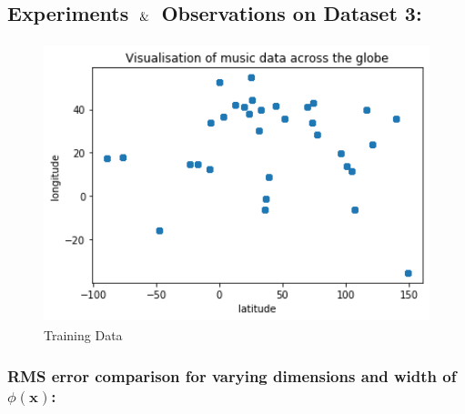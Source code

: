 





\subsection{Experiments $\And$ Observations on Dataset 3:}

\begin{figure}[!ht]
    \centering
        \includegraphics[height=3.2in]{Task 3 Images/Visualisation of music data across the globe.png}
        \caption{Training Data}
\end{figure}

\subsubsection{RMS error comparison for varying dimensions and width of $\mathbb{\phi}(\mathbf{x})$:}

